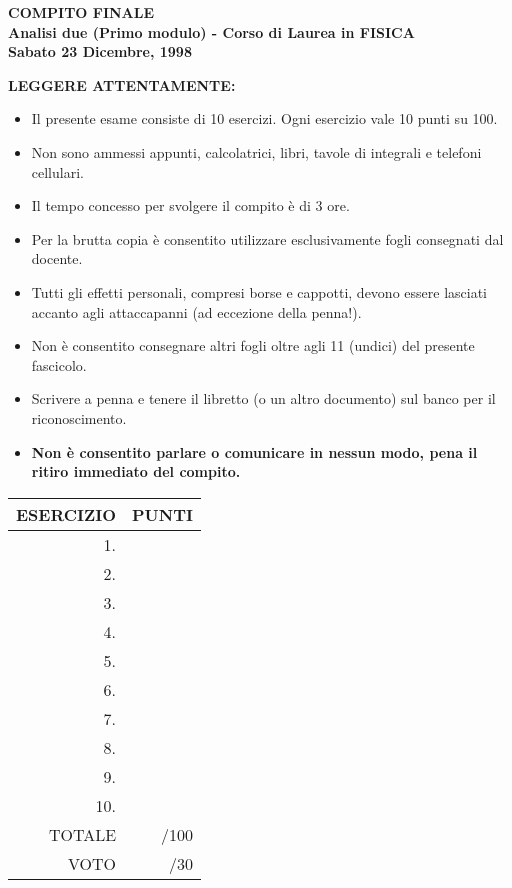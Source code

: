 \documentclass[12pt,a4paper]{report}\pagenumbering{roman}
\begin{document}
\begin{center}
{\bf COMPITO FINALE}\\
{\bf Analisi due (Primo modulo) - Corso di Laurea in FISICA}\\
{\bf Sabato 23 Dicembre, 1998}
\end{center}
{\Large\bf LEGGERE ATTENTAMENTE:}
\begin{itemize}
\item Il presente esame consiste di 10 esercizi. Ogni esercizio 
vale 10 punti su 100.
\item Non sono ammessi appunti, calcolatrici, 
libri, tavole di integrali e telefoni cellulari.
\item Il tempo concesso per svolgere il compito \`e di 3 ore.
\item Per la brutta copia \`e consentito utilizzare 
esclusivamente fogli consegnati dal docente.
\item Tutti gli effetti personali, compresi borse e cappotti, devono 
essere lasciati accanto agli attaccapanni (ad eccezione della penna!).
\item Non \`e consentito consegnare altri fogli oltre agli 11 (undici)
del presente fascicolo.
\item Scrivere a penna e tenere il libretto (o un altro documento) sul banco per
il riconoscimento.
\item {\bf Non \`e consentito parlare o comunicare in nessun modo, pena
il ritiro immediato del compito.} 
\end{itemize}
\begin{center}
\begin{tabular}{||r|r||}
\hline ESERCIZIO & PUNTI\\  \hline
\hline 1.& \\
\hline 2.& \\
\hline 3.& \\
\hline 4.& \\
\hline 5.& \\
\hline 6.& \\
\hline 7.& \\
\hline 8.& \\
\hline 9.& \\
\hline 10.& \\
\hline TOTALE & /100\\
\hline VOTO& /30\\
\hline
\end{tabular}
\end{center}
\pagebreak
\end{document}
